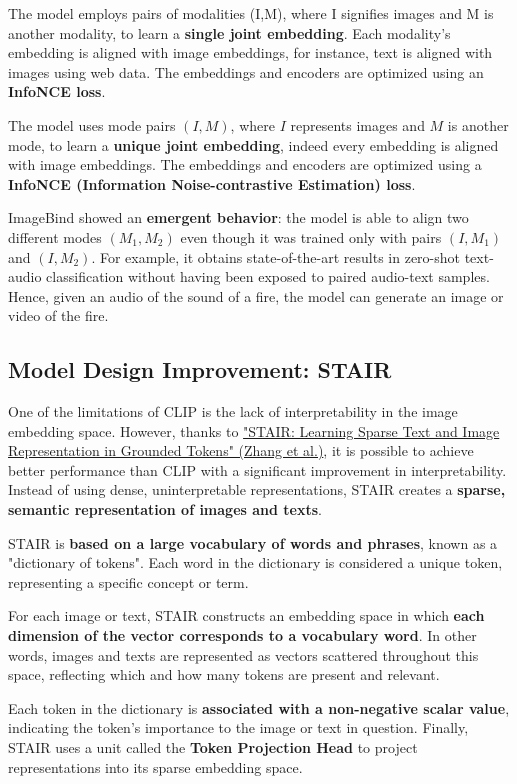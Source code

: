 The model employs pairs of modalities (I,M), where I signifies images and M is another modality, to learn a \textbf{single joint embedding}. Each modality’s embedding is aligned with image embeddings, for instance, text is aligned with images using web data. The embeddings and encoders are optimized using an \textbf{InfoNCE loss}.

The model uses mode pairs \((I, M)\), where \(I\) represents images and \(M\) is another mode, to learn a \textbf{unique joint embedding}, indeed every embedding is aligned with image embeddings. The embeddings and encoders are optimized using a \textbf{InfoNCE (Information Noise-contrastive Estimation) loss}.

ImageBind showed an \textbf{emergent behavior}: the model is able to align two different modes \((M_1, M_2)\) even though it was trained only with pairs \((I, M_1)\) and \((I, M_2)\). For example, it obtains state-of-the-art results in zero-shot text-audio classification without having been exposed to paired audio-text samples. Hence, given an audio of the sound of a fire, the model can generate an image or video of the fire.


\subsection{Model Design Improvement: STAIR}
One of the limitations of CLIP is the lack of interpretability in the image embedding space. However, thanks to \href{https://arxiv.org/pdf/2301.13081}{"STAIR: Learning Sparse Text and Image Representation in Grounded Tokens" (Zhang et al.)}, it is possible to achieve better performance than CLIP with a significant improvement in interpretability. Instead of using dense, uninterpretable representations, STAIR creates a \textbf{sparse, semantic representation of images and texts}. 

STAIR is \textbf{based on a large vocabulary of words and phrases}, known as a "dictionary of tokens". Each word in the dictionary is considered a unique token, representing a specific concept or term.

For each image or text, STAIR constructs an embedding space in which \textbf{each dimension of the vector corresponds to a vocabulary word}. In other words, images and texts are represented as vectors scattered throughout this space, reflecting which and how many tokens are present and relevant.

Each token in the dictionary is \textbf{associated with a non-negative scalar value}, indicating the token's importance to the image or text in question.  Finally, STAIR uses a unit called the \textbf{Token Projection Head} to project representations into its sparse embedding space.

